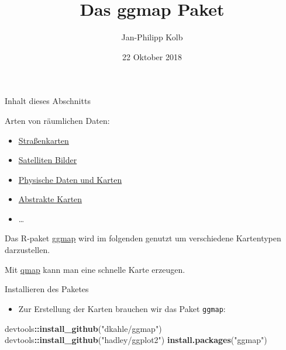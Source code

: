 \documentclass[ignorenonframetext,]{beamer}
\title{Das ggmap Paket}
\author{Jan-Philipp Kolb}
\date{22 Oktober 2018}
\newenvironment{Shaded}{\begin{snugshade}}{\end{snugshade}}
\newcommand{\KeywordTok}[1]{\textcolor[rgb]{0.13,0.29,0.53}{\textbf{#1}}}
\newcommand{\NormalTok}[1]{#1}
\newcommand{\OperatorTok}[1]{\textcolor[rgb]{0.81,0.36,0.00}{\textbf{#1}}}
\newcommand{\StringTok}[1]{\textcolor[rgb]{0.31,0.60,0.02}{#1}}
\providecommand{\tightlist}{%
  \setlength{\itemsep}{0pt}\setlength{\parskip}{0pt}}
\begin{document}
\frame{\titlepage}

\begin{frame}{Inhalt dieses Abschnitts}
\protect\hypertarget{inhalt-dieses-abschnitts}{}

Arten von räumlichen Daten:

\begin{itemize}
\tightlist
\item
  \href{https://www.nceas.ucsb.edu/~frazier/RSpatialGuides/ggmap/ggmapCheatsheet.pdf}{Straßenkarten}
\item
  \href{http://www.mostlymuppet.com/tag/maps/}{Satelliten Bilder}
\item
  \href{http://gis.stackexchange.com/questions/3083/what-makes-a-map-beautiful/45518\#45518}{Physische
  Daten und Karten}
\item
  \href{http://www.designfaves.com/2014/03/abstracted-maps-reveal-cities-personalities}{Abstrakte
  Karten}
\item
  \ldots{}
\end{itemize}

Das R-paket
\href{http://journal.r-project.org/archive/2013-1/kahle-wickham.pdf}{ggmap}
wird im folgenden genutzt um verschiedene Kartentypen darzustellen.

Mit \href{http://www.inside-r.org/packages/cran/ggmap/docs/qmap}{qmap}
kann man eine schnelle Karte erzeugen.

\end{frame}

\begin{frame}[fragile]{Installieren des Paketes}
\protect\hypertarget{installieren-des-paketes}{}

\begin{itemize}
\tightlist
\item
  Zur Erstellung der Karten brauchen wir das Paket \texttt{ggmap}:
\end{itemize}

\begin{Shaded}
\begin{Highlighting}[]
\NormalTok{devtools}\OperatorTok{::}\KeywordTok{install_github}\NormalTok{(}\StringTok{"dkahle/ggmap"}\NormalTok{)}
\NormalTok{devtools}\OperatorTok{::}\KeywordTok{install_github}\NormalTok{(}\StringTok{"hadley/ggplot2"}\NormalTok{)}
\KeywordTok{install.packages}\NormalTok{(}\StringTok{"ggmap"}\NormalTok{)}
\end{Highlighting}
\end{Shaded}

\end{frame}
\end{document}
